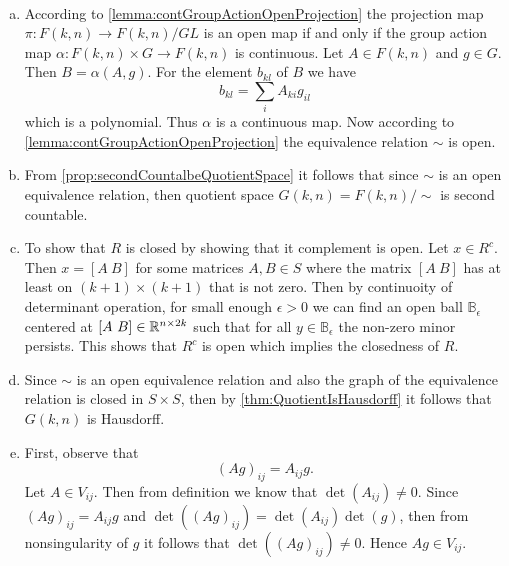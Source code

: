 \begin{solution}
			$ \ $
	\begin{enumerate}[(a)]
		\item According to \autoref{lemma:contGroupActionOpenProjection} the projection map $ \pi : F(k,n) \to F(k,n)/GL $ is an open map if and only if the group action map $ \alpha:  F(k,n)\times G \to  F(k,n)  $ is continuous. Let $ A \in F(k,n) $ and $ g \in G $. Then $ B = \alpha(A,g) $. For the element $ b_{kl} $ of $ B $ we have 
		\[ b_{kl} = \sum_{i} A_{ki}g_{il} \]
		which is a polynomial. Thus $ \alpha $ is a continuous map. Now according to \autoref{lemma:contGroupActionOpenProjection} the equivalence relation $ \sim $ is open.
		
		\item From \autoref{prop:secondCountalbeQuotientSpace} it follows that since $ \sim $ is an open equivalence relation, then quotient space $ G(k,n) = F(k,n)/\sim $ is second countable.
		
		\item To show that $ R $ is closed by showing that it complement is open. Let $ x \in R^c $. Then $ x = [A\ B] $ for some matrices $ A,B \in S $ where the matrix $ [A\ B] $ has at least on $ (k+1)\times (k+1) $ that is not zero. Then by continuoity of determinant operation, for small enough $ \epsilon >0 $ we can find an open ball $ \mathbb{B}_\epsilon $ centered at $ [A\ B] \in \mathbb{R}^{n\times2k}$ such that for all $ y \in \mathbb{B}_\epsilon  $ the non-zero minor persists. This shows that $ R^c $ is open which implies the closedness of $ R $.
		
		\item Since $ \sim $ is an open equivalence relation and also the graph of the equivalence relation is closed in $ S\times S $, then by \autoref{thm:QuotientIsHausdorff} it follows that $ G(k,n) $ is Hausdorff.
		
		\item First, observe that 
		\[ (Ag)_{ij} = A_{ij} g. \]
		Let $ A \in V_{ij} $. Then from definition we know that $ \det(A_{ij}) \neq 0 $. Since $ (Ag)_{ij} = A_{ij}g $ and $ \det((Ag)_{ij}) = \det(A_{ij})\det(g) $, then from nonsingularity of $ g $ it follows that $ \det((Ag)_{ij}) \neq 0 $. Hence $ Ag \in V_{ij} $.
		

\end{enumerate}
\end{solution}
